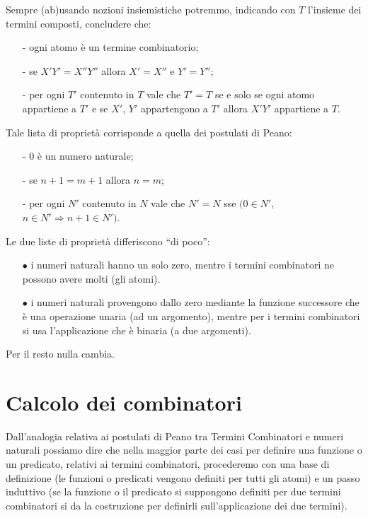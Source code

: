 \documentclass{book}
\begin{document}
Sempre (ab)usando nozioni insiemistiche potremmo, indicando con $T$
l'insieme dei termini composti, concludere che:

\begin{enumerate}
\item[-]ogni atomo \`e un termine combinatorio;
\item[-]se $X'Y' = X''Y''$ allora  $ X'=X''$ e $ Y'=Y'' $;
\item[-]per ogni $T'$ contenuto in $T$ vale che $T' = T$ se e solo se ogni 
  atomo appartiene a $T'$ e se $X'$, $Y'$ appartengono a $T'$ allora $X'Y'$ 
  appartiene  a $T$.
\end{enumerate}

Tale lista di propriet\`a corrisponde a quella dei postulati di Peano:

\begin{enumerate}
\item[-]0 \`e un numero naturale;
\item[-]se $n+1 = m+1$ allora $n = m$;
\item[-]per ogni $N'$ contenuto in $N$ vale che  $N' = N$ sse $(0 \in N'$,
$n \in N' \Rightarrow  n+1 \in N')$.
\end{enumerate}

Le due liste di propriet\`a differiscono ``di poco'':
\begin{enumerate}
\item[$\bullet$]i numeri naturali hanno un solo zero, mentre i termini
combinatori ne possono avere molti (gli atomi).
\item[$\bullet$]i numeri naturali provengono dallo zero mediante la funzione
successore che \`e una operazione unaria (ad un argomento), mentre per i
termini combinatori si usa l'applicazione che \`e binaria (a due argomenti).
\end{enumerate}
Per il resto nulla cambia.


\chapter{Calcolo dei combinatori}
Dall'analogia relativa ai postulati di Peano tra Termini Combinatori e numeri
naturali possiamo dire che nella maggior parte dei casi per definire una
funzione o un predicato, relativi ai termini combinatori, procederemo con una
base di definizione (le funzioni o predicati vengono definiti per tutti gli
atomi) e un passo induttivo (se la funzione o il predicato si suppongono
definiti per due termini combinatori si da la costruzione per definirli
sull'applicazione dei due termini).
\end{document}
